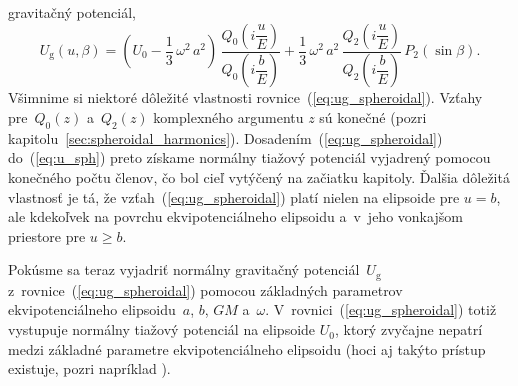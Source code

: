 \documentclass[a4paper, 12pt]{book}
\newcommand{\gidx}{\mathrm g}
\begin{document}
gravitačný potenciál,
%
\begin{equation}
\label{eq:ug_spheroidal}
U_\gidx(u, \beta) = \left( U_0 - \frac{1}{3} \, \omega^2 \, a^2 \right) \, 
\frac{Q_0\left( i \dfrac{u}{E} \right)}{Q_0\left( i \dfrac{b}{E} \right)} 
+ \frac{1}{3} \, \omega^2 \, a^2  \, \frac{Q_2\left( i \dfrac{u}{E} 
\right)}{Q_2\left( i \dfrac{b}{E} \right)} \, P_2(\sin\beta){.}
\end{equation}
%
Všimnime si niektoré dôležité vlastnosti rovnice~(\ref{eq:ug_spheroidal}).  
Vzťahy pre~$Q_0(z)$ a~$Q_2(z)$ komplexného argumentu $z$ sú konečné (pozri 
kapitolu~\ref{sec:spheroidal_harmonics}).  Dosadením~(\ref{eq:ug_spheroidal}) 
do~(\ref{eq:u_sph}) preto získame normálny tiažový potenciál vyjadrený pomocou 
konečného počtu členov, čo bol cieľ vytýčený na začiatku kapitoly.  Ďalšia 
dôležitá vlastnosť je tá, že vzťah~(\ref{eq:ug_spheroidal}) platí nielen na 
elipsoide pre $u = b$, ale kdekoľvek na povrchu ekvipotenciálneho elipsoidu 
a~v~jeho vonkajšom priestore pre $u \geq b$.

Pokúsme sa teraz vyjadriť normálny gravitačný potenciál~$U_\gidx$ 
z~rovnice~(\ref{eq:ug_spheroidal}) pomocou základných parametrov 
ekvipotenciálneho elipsoidu~$a$, $b$, $GM$ a~$\omega$.  
V~rovnici~(\ref{eq:ug_spheroidal}) totiž vystupuje normálny tiažový potenciál 
na elipsoide $U_0$, ktorý zvyčajne nepatrí medzi základné parametre 
ekvipotenciálneho elipsoidu (hoci aj takýto prístup existuje, pozri napríklad 
\cite{TorgeGeodesy}).
\end{document}
